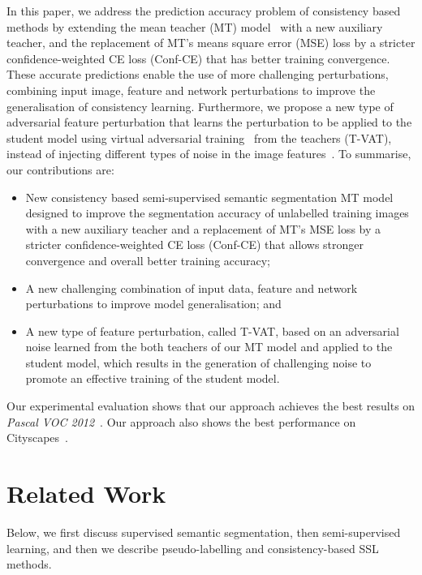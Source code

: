 \documentclass[10pt,twocolumn,letterpaper]{article}
\begin{document}
In this paper, we address the prediction accuracy problem of consistency based methods by extending the mean teacher (MT) model~\cite{tarvainen2017mean,french2019semi,chen2021semi, ke2020guided} with a new auxiliary teacher, and the replacement of MT's means square error (MSE) loss by a stricter confidence-weighted CE loss (Conf-CE) that has better training convergence.
These accurate predictions  enable the use of more challenging perturbations, combining input image, feature and network perturbations to improve the generalisation of consistency learning.
Furthermore, we propose a new type of adversarial feature perturbation that learns the perturbation to be applied to the student model using virtual adversarial training~\cite{miyato2018virtual} from the teachers (T-VAT), instead of injecting different types of noise in the image features~\cite{ouali2020semi}.
To summarise, our contributions are:
\begin{itemize}
\item New consistency based semi-supervised semantic segmentation MT model designed to improve the segmentation accuracy of unlabelled training images with a new auxiliary teacher and a replacement of MT's MSE loss by a stricter confidence-weighted CE loss (Conf-CE) that allows stronger convergence and overall better training accuracy;
\item A new challenging combination of input data, feature and network perturbations to improve model generalisation; and
\item A new type of feature perturbation, called T-VAT, based on an adversarial noise learned from the both teachers of our MT model and applied to the student model, which results in the generation of challenging noise to promote an effective training of the student model.
\end{itemize}
Our experimental evaluation shows that our approach achieves the best results on \textit{Pascal VOC 2012}~\cite{everingham2015pascal}. Our approach also shows the best performance on Cityscapes~\cite{cordts2016Cityscapes}. 






\section{Related Work}

Below, we first discuss supervised semantic segmentation, then semi-supervised learning, and then we describe pseudo-labelling and consistency-based SSL methods.
\end{document}
